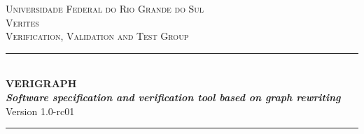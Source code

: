 \documentclass[12pt]{article}
\begin{document}
\begin{titlepage}

\newcommand{\HRule}{\rule{\linewidth}{0.5mm}} %

\center %
 

\textsc{\normalsize Universidade Federal do Rio Grande do Sul}\\[1.0cm] %
\textsc{\Large Verites}\\[0.2cm] %
\textsc{\large Verification, Validation and Test Group}\\[0.2cm] %


\HRule \\[0.4cm]
{ \huge \bfseries \LARGE{VERIGRAPH} \\ [1.0cm]
\emph{\large{Software specification and verification tool based on graph rewriting}}
}\\[0.5cm]

Version 1.0-rc01 \\[0.4cm] %
\HRule \\[1.0cm]
 




\end{titlepage}
\end{document}
